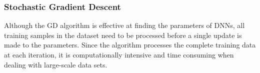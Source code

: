\documentclass[conference]{IEEEtran}
\begin{document}













\subsubsection{Stochastic Gradient Descent}
Although the GD algorithm is effective at finding the parameters of DNNs, all  training samples in the dataset need to be processed
before a single update is made to the parameters. Since the algorithm processes the complete training data at each iteration, 
it is computationally intensive and time consuming when dealing with large-scale data sets. 
\end{document}
